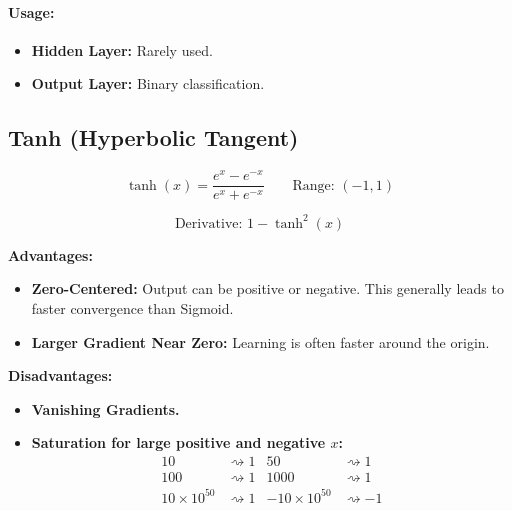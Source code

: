 \paragraph{Usage:}
\begin{itemize}
    \item \textbf{Hidden Layer:} Rarely used.
    \item \textbf{Output Layer:} Binary classification.
\end{itemize}

\subsection{Tanh (Hyperbolic Tangent)}

\begin{equation}
\tanh(x) = \frac{e^x - e^{-x}}{e^x + e^{-x}} \qquad \text{Range: } (-1, 1)
\end{equation}

\begin{equation}
\text{Derivative: } 1 - \tanh^2(x)
\end{equation}

\tanhplot

\begin{advbox}
\textbf{Advantages:}
\begin{itemize}
    \item \textbf{Zero-Centered:} Output can be positive or negative. This generally leads to faster convergence than Sigmoid.
    \item \textbf{Larger Gradient Near Zero:} Learning is often faster around the origin.
\end{itemize}

\tcbline

\textbf{Disadvantages:}
\begin{itemize}
    \item \textbf{Vanishing Gradients.}
    \item \textbf{Saturation for large positive and negative $x$:}
    \begin{align*}
        10 &\rightsquigarrow 1 & 50 &\rightsquigarrow 1 \\
        100 &\rightsquigarrow 1 & 1000 &\rightsquigarrow 1 \\
        10 \times 10^{50} &\rightsquigarrow 1 & -10 \times 10^{50} &\rightsquigarrow -1
    \end{align*}
\end{itemize}
\end{advbox}

